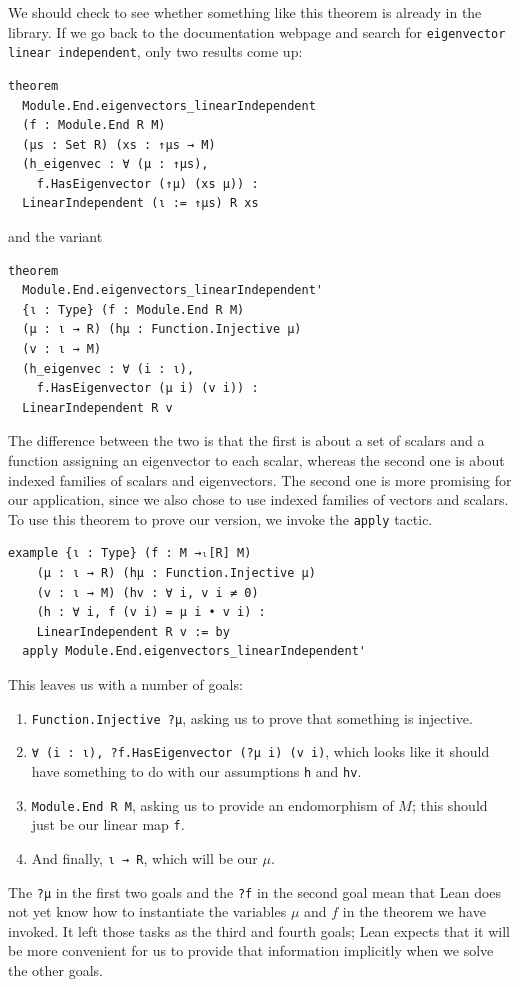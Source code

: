 \documentclass[11pt]{article}
\def\lean{\lstinline[language=lean]}
\begin{document}
We should check to see whether something like this theorem is already
in the library.
If we go back to the documentation webpage and search for \texttt{eigenvector linear independent},
only two results come up:
\begin{lstlisting}
theorem
  Module.End.eigenvectors_linearIndependent
  (f : Module.End R M)
  (μs : Set R) (xs : ↑μs → M)
  (h_eigenvec : ∀ (μ : ↑μs),
    f.HasEigenvector (↑μ) (xs μ)) :
  LinearIndependent (ι := ↑μs) R xs
\end{lstlisting}
and the variant
\begin{lstlisting}
theorem
  Module.End.eigenvectors_linearIndependent'
  {ι : Type} (f : Module.End R M)
  (μ : ι → R) (hμ : Function.Injective μ)
  (v : ι → M)
  (h_eigenvec : ∀ (i : ι),
    f.HasEigenvector (μ i) (v i)) :
  LinearIndependent R v
\end{lstlisting}
The difference between the two is that the first is about a set of scalars and a function assigning an eigenvector to each scalar, whereas the second one is about indexed families of scalars and eigenvectors.
The second one is more promising for our application, since we also chose to use indexed families of vectors and scalars.
To use this theorem to prove our version, we invoke the
\lean"apply" tactic.
\begin{lstlisting}
example {ι : Type} (f : M →ₗ[R] M)
    (μ : ι → R) (hμ : Function.Injective μ)
    (v : ι → M) (hv : ∀ i, v i ≠ 0)
    (h : ∀ i, f (v i) = μ i • v i) :
    LinearIndependent R v := by
  apply Module.End.eigenvectors_linearIndependent'
\end{lstlisting}
This leaves us with a number of goals:
\begin{enumerate}
  \item \lean"Function.Injective ?μ", asking us to prove that something is injective.
  \item \lean"∀ (i : ι), ?f.HasEigenvector (?μ i) (v i)", which looks like it should have something to do with our assumptions \texttt{h} and \texttt{hv}.
  \item \lean"Module.End R M", asking us to provide an endomorphism of $M$; this should just be our linear map \texttt{f}.
  \item And finally, \lean"ι → R", which will be our $\mu$.
\end{enumerate}
The \lean"?μ" in the first two goals and the \lean"?f" in the second goal mean that Lean does not yet know how to instantiate the variables $\mu$ and $f$ in the theorem we have invoked.
It left those tasks as the third and fourth goals; Lean expects that it will be more convenient for us to provide that information implicitly when we solve the other goals.
\end{document}
